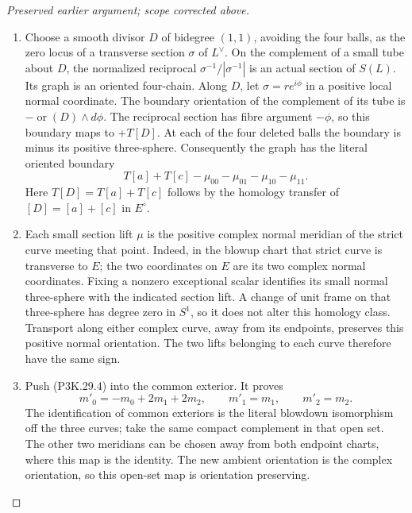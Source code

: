 \begin{proof}[Preserved earlier argument; scope corrected above]
\begin{enumerate}[label=\arabic*.]
\item Choose a smooth divisor \(D\) of bidegree \((1,1)\), avoiding the
four balls, as the zero locus of a transverse section \(\sigma\)
of \(L^\vee\). On the complement of a small tube about \(D\),
the normalized reciprocal \(\sigma^{-1}/|\sigma^{-1}|\) is an
actual section of \(S(L)\). Its graph is an oriented four-chain.
Along \(D\), let \(\sigma=re^{i\phi}\) in a positive local normal
coordinate. The boundary orientation of the complement of its
tube is
\(-\operatorname{or}(D)\wedge d\phi\). The reciprocal section
has fibre argument \(-\phi\), so this boundary maps to
\(+T[D]\). At each of the four deleted balls the boundary is
minus its positive three-sphere. Consequently the graph has
the literal oriented boundary
\[
           T[a]+T[c]-\mu_{00}-\mu_{01}-\mu_{10}-\mu_{11}.
                                                        \tag{P3K.29.4}
\]
Here \(T[D]=T[a]+T[c]\) follows by the homology transfer of
\([D]=[a]+[c]\) in \(E^\circ\).

\item Each small section lift \(\mu\) is the positive complex normal
meridian of the strict curve meeting that point. Indeed, in the
blowup chart that strict curve is transverse to \(E\); the two
coordinates on \(E\) are its two complex normal coordinates.
Fixing a nonzero exceptional scalar identifies its small normal
three-sphere with the indicated section lift. A change of unit
frame on that three-sphere has degree zero in \(S^1\), so it
does not alter this homology class. Transport along either
complex curve, away from its endpoints, preserves this positive
normal orientation. The two lifts belonging to each curve
therefore have the same sign.

\item Push (P3K.29.4) into the common exterior. It proves
\[
        m'_0=-m_0+2m_1+2m_2,\qquad
        m'_1=m_1,\qquad m'_2=m_2.                        \tag{P3K.29.5}
\]
The identification of common exteriors is the literal blowdown
isomorphism off the three curves; take the same compact
complement in that open set. The other two meridians can be
chosen away from both endpoint charts, where this map is the
identity. The new ambient orientation is the complex orientation,
so this open-set map is orientation preserving.


\end{enumerate}
\end{proof}
